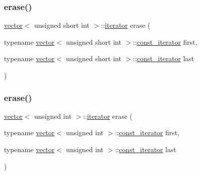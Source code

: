 \subsubsection{\texorpdfstring{erase()}{erase()}\hspace{0.1cm}{\footnotesize\ttfamily [22/28]}}
{\footnotesize\ttfamily \mbox{\hyperlink{classvector}{vector}}$<$ unsigned short int $>$\+::\mbox{\hyperlink{classvector_a35c955cacac6aacaa1e82874b1628865}{iterator}} erase (\begin{DoxyParamCaption}\item[{typename \mbox{\hyperlink{classvector}{vector}}$<$ unsigned short int $>$\+::\mbox{\hyperlink{classvector_a2fc97dce62b7053449cc868607540dba}{const\+\_\+iterator}}}]{first,  }\item[{typename \mbox{\hyperlink{classvector}{vector}}$<$ unsigned short int $>$\+::\mbox{\hyperlink{classvector_a2fc97dce62b7053449cc868607540dba}{const\+\_\+iterator}}}]{last }\end{DoxyParamCaption})}

\mbox{\label{classvector_a79f04edca3074505dbbb8a8640db168e}} 
\subsubsection{\texorpdfstring{erase()}{erase()}\hspace{0.1cm}{\footnotesize\ttfamily [23/28]}}
{\footnotesize\ttfamily \mbox{\hyperlink{classvector}{vector}}$<$ unsigned int $>$\+::\mbox{\hyperlink{classvector_a35c955cacac6aacaa1e82874b1628865}{iterator}} erase (\begin{DoxyParamCaption}\item[{typename \mbox{\hyperlink{classvector}{vector}}$<$ unsigned int $>$\+::\mbox{\hyperlink{classvector_a2fc97dce62b7053449cc868607540dba}{const\+\_\+iterator}}}]{first,  }\item[{typename \mbox{\hyperlink{classvector}{vector}}$<$ unsigned int $>$\+::\mbox{\hyperlink{classvector_a2fc97dce62b7053449cc868607540dba}{const\+\_\+iterator}}}]{last }\end{DoxyParamCaption})}

\mbox{\label{classvector_a523114bde6a1401bdf01cde27ddfc2cb}} 
